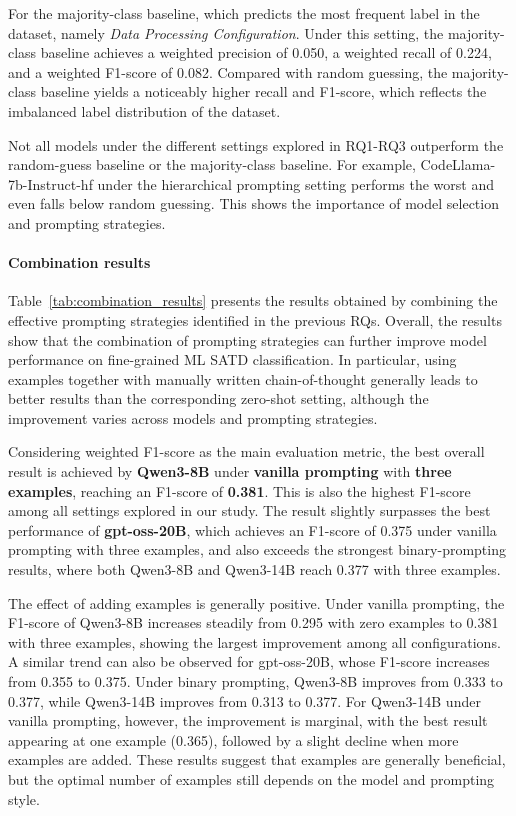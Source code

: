 \documentclass[acmsmall,screen,review,anonymous]{acmart}
\begin{document}
For the majority-class baseline, which predicts the most frequent label in the dataset, namely \textit{Data Processing Configuration}. Under this setting, the majority-class baseline achieves a weighted precision of 0.050, a weighted recall of 0.224, and a weighted F1-score of 0.082. Compared with random guessing, the majority-class baseline yields a noticeably higher recall and F1-score, which reflects the imbalanced label distribution of the dataset. 



Not all models under the different settings explored in RQ1-RQ3 outperform the random-guess baseline or the majority-class baseline. For example, CodeLlama-7b-Instruct-hf under the hierarchical prompting setting performs the worst and even falls below random guessing. This shows the importance of model selection and prompting strategies.


\paragraph{Combination results}

Table~\ref{tab:combination_results} presents the results obtained by combining the effective prompting strategies identified in the previous RQs. Overall, the results show that the combination of prompting strategies can further improve model performance on fine-grained ML SATD classification. In particular, using examples together with manually written chain-of-thought generally leads to better results than the corresponding zero-shot setting, although the improvement varies across models and prompting strategies.

Considering weighted F1-score as the main evaluation metric, the best overall result is achieved by \textbf{Qwen3-8B} under \textbf{vanilla prompting} with \textbf{three examples}, reaching an F1-score of \textbf{0.381}. This is also the highest F1-score among all settings explored in our study. The result slightly surpasses the best performance of \textbf{gpt-oss-20B}, which achieves an F1-score of 0.375 under vanilla prompting with three examples, and also exceeds the strongest binary-prompting results, where both Qwen3-8B and Qwen3-14B reach 0.377 with three examples.

The effect of adding examples is generally positive. Under vanilla prompting, the F1-score of Qwen3-8B increases steadily from 0.295 with zero examples to 0.381 with three examples, showing the largest improvement among all configurations. A similar trend can also be observed for gpt-oss-20B, whose F1-score increases from 0.355 to 0.375. Under binary prompting, Qwen3-8B improves from 0.333 to 0.377, while Qwen3-14B improves from 0.313 to 0.377. For Qwen3-14B under vanilla prompting, however, the improvement is marginal, with the best result appearing at one example (0.365), followed by a slight decline when more examples are added. These results suggest that examples are generally beneficial, but the optimal number of examples still depends on the model and prompting style.
\end{document}
